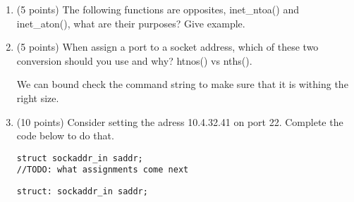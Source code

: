 \documentclass{article}[9pt]
\newenvironment{answerfont}{\fontfamily{qhv}\selectfont}{\par}
\newenvironment{myanswer}{\begin{mdframed}\begin{answerfont}}{\end{answerfont}\end{mdframed}}
\begin{document}
\begin{enumerate}
\item (5 points) The following functions are opposites, inet_ntoa() and inet_aton(), what are their purposes? Give example.

  \begin{myanswer}
  \end{myanswer}

\item (5 points) When assign a port to a socket address, which of these two conversion should you use and why? htnos() vs nths().

  \begin{myanswer}
  We can bound check the command string to make sure that it is withing the right size.
  \end{myanswer}

\item (10 points) Consider setting the adress 10.4.32.41 on port 22. Complete the code below to do that.

\begin{enumerate}
\begin{verbatim}
struct sockaddr_in saddr;
//TODO: what assignments come next
\end{verbatim}
\end{enumerate}

\begin{myanswer}
\begin{verbatim}
struct: sockaddr_in saddr;

\end{verbatim}
\end{myanswer}


\end{enumerate}
\end{document}
